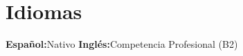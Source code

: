 
\section{Idiomas}

\ifdefined\cvEnglishAdvanced
\else
  {\small%
    \textbf{Español:}\enspace Nativo\qquad%
    \textbf{Inglés:}\enspace Competencia Profesional (B2)%
  }%
\fi
